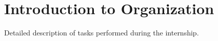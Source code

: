 \chapter{Introduction to Organization}
Detailed description of tasks performed during the internship.





